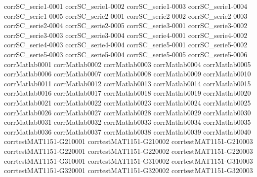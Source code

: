 {corrSC_serie1-0001}
{corrSC_serie1-0002}
{corrSC_serie1-0003}
{corrSC_serie1-0004}
{corrSC_serie1-0005}
{corrSC_serie2-0001}
{corrSC_serie2-0002}
{corrSC_serie2-0003}
{corrSC_serie2-0004}
{corrSC_serie2-0005}
{corrSC_serie3-0001}
{corrSC_serie3-0002}
{corrSC_serie3-0003}
{corrSC_serie3-0004}
{corrSC_serie4-0001}
{corrSC_serie4-0002}
{corrSC_serie4-0003}
{corrSC_serie4-0004}
{corrSC_serie5-0001}
{corrSC_serie5-0002}
{corrSC_serie5-0003}
{corrSC_serie5-0004}
{corrSC_serie5-0005}
{corrSC_serie5-0006}
{corrMatlab0001}
{corrMatlab0002}
{corrMatlab0003}
{corrMatlab0004}
{corrMatlab0005}
{corrMatlab0006}
{corrMatlab0007}
{corrMatlab0008}
{corrMatlab0009}
{corrMatlab0010}
{corrMatlab0011}
{corrMatlab0012}
{corrMatlab0013}
{corrMatlab0014}
{corrMatlab0015}
{corrMatlab0016}
{corrMatlab0017}
{corrMatlab0018}
{corrMatlab0019}
{corrMatlab0020}
{corrMatlab0021}
{corrMatlab0022}
{corrMatlab0023}
{corrMatlab0024}
{corrMatlab0025}
{corrMatlab0026}
{corrMatlab0027}
{corrMatlab0028}
{corrMatlab0029}
{corrMatlab0030}
{corrMatlab0031}
{corrMatlab0032}
{corrMatlab0033}
{corrMatlab0034}
{corrMatlab0035}
{corrMatlab0036}
{corrMatlab0037}
{corrMatlab0038}
{corrMatlab0039}
{corrMatlab0040}
{corrtestMAT1151-G210001}
{corrtestMAT1151-G210002}
{corrtestMAT1151-G210003}
{corrtestMAT1151-G220001}
{corrtestMAT1151-G220002}
{corrtestMAT1151-G220003}
{corrtestMAT1151-G310001}
{corrtestMAT1151-G310002}
{corrtestMAT1151-G310003}
{corrtestMAT1151-G320001}
{corrtestMAT1151-G320002}
{corrtestMAT1151-G320003}

